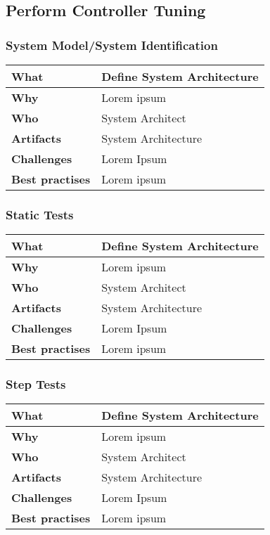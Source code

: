 \subsection{Perform Controller Tuning}
\subsubsection{System Model/System Identification}
 \label{table:ch6_Task_Define_System_Architect}
\begin{tabular}
	{|m{3cm}|m{10cm}|} \hline \bfseries What & Define System Architecture\\
	\hline \bfseries Why & Lorem ipsum\\
	\hline \bfseries Who & System Architect\\
	\hline \bfseries Artifacts & System Architecture\\
	\hline \bfseries Challenges & Lorem Ipsum\\
	\hline \bfseries Best practises & Lorem ipsum\\
	\hline 
\end{tabular}

\subsubsection{Static Tests}
 \label{table:ch6_Task_Define_System_Architect}
\begin{tabular}
	{|m{3cm}|m{10cm}|} \hline \bfseries What & Define System Architecture\\
	\hline \bfseries Why & Lorem ipsum\\
	\hline \bfseries Who & System Architect\\
	\hline \bfseries Artifacts & System Architecture\\
	\hline \bfseries Challenges & Lorem Ipsum\\
	\hline \bfseries Best practises & Lorem ipsum\\
	\hline 
\end{tabular}

\subsubsection{Step Tests}
 \label{table:ch6_Task_Define_System_Architect}
\begin{tabular}
	{|m{3cm}|m{10cm}|} \hline \bfseries What & Define System Architecture\\
	\hline \bfseries Why & Lorem ipsum\\
	\hline \bfseries Who & System Architect\\
	\hline \bfseries Artifacts & System Architecture\\
	\hline \bfseries Challenges & Lorem Ipsum\\
	\hline \bfseries Best practises & Lorem ipsum\\
	\hline 
\end{tabular}

